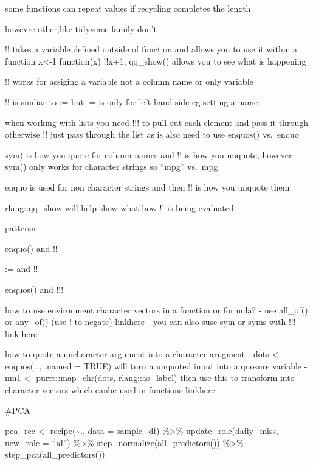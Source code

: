 \documentclass[
  letterpaper,
  DIV=11,
  numbers=noendperiod]{scrreprt}
\begin{document}
some functions can repeat values if recycling completes the length

howevre other,like tidyverse family don't

!! takes a variable defined outside of function and allows you to use it
within a function x\textless-1 function(x) !!x+1, qq\_show() allows you
to see what is happening

!! works for assiging a variable not a column name or only variable

!! is simliar to := but := is only for left hand side eg setting a name

when working with lists you need !!! to pull out each element and pass
it through otherwise !! just pass through the list as is also need to
use enquos() vs.~enquo

sym) is how you quote for column names and !! is how you unquote,
however sym() only works for character strings so ``mpg'' vs.~mpg

enquo is used for non character strings and then !! is how you unquote
them

rlang::qq\_show will help show what how !! is being evaluated

pattersn

enquo() and !!

:= and !!

enquos() and !!!

how to use environment character vectors in a function or formula? - use
all\_of() or any\_of() (use ! to negate)
\href{https://dplyr.tidyverse.org/articles/programming.html}{linkhere} -
you can also suse sym or syms with !!!
\href{https://stackoverflow.com/questions/34487641/dplyr-groupby-on-multiple-columns-using-variable-names}{link
here}

how to quote a uncharacter argument into a character arugment - dots
\textless- enquos(\ldots, .named = TRUE) will turn a unquoted input into
a quosure variable - nm1 \textless- purrr::map\_chr(dots,
rlang::as\_label) then use this to transform into character vectors
which canbe used in functions
\href{https://stackoverflow.com/questions/63257632/curly-curly-tidy-evaluation-programming-with-multiple-inputs-and-custom-function}{linkhere}

\#PCA

pca\_rec \textless- recipe(\textasciitilde., data = sample\_df)
\%\textgreater\% update\_role(daily\_miss, new\_role = ``id'')
\%\textgreater\% step\_normalize(all\_predictors()) \%\textgreater\%
step\_pca(all\_predictors())
\end{document}
